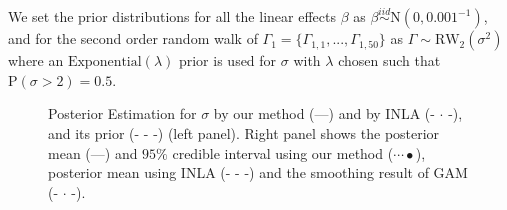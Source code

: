 \documentclass[]{article}
\begin{document}
We set the prior distributions for all the linear effects $\beta$ as $\beta \stackrel{iid}{\sim} \text{N}(0, 0.001^{-1})$, and for the second order random walk of $\Gamma_1 = \{\Gamma_{1,1}, ..., \Gamma_{1,50}\}$ as $\Gamma \sim \text{RW}_2(\sigma^2)$ where an $\text{Exponential}(\lambda)$ prior is used for $\sigma$ with $\lambda$ chosen such that $\text{P}(\sigma > 2) = 0.5$. 

\begin{figure}[ht]
\centering
{}

\caption{Posterior Estimation for $\sigma$ by our method (---) and by INLA (- $\cdot$ -), and its prior (- - -)  (left panel). Right panel shows the posterior mean (---) and $95\%$ credible interval using our method ($\cdots•$), posterior mean using INLA (- - -) and the smoothing result of GAM (- $\cdot$ -).}
\label{fig:leuk}
\end{figure}
\end{document}
